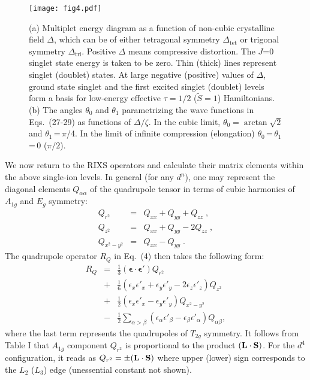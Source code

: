 \documentclass[twocolumn,prb,aps,showpacs,superscriptaddress]{revtex4-1}
\begin{document}
\begin{figure}
\centerline{\texttt{[image: fig4.pdf]}}
\caption{(a) Multiplet energy diagram as a function of non-cubic crystalline 
field $\Delta$, which can be of either tetragonal symmetry $\Delta_{\textrm{tet}}$
or trigonal symmetry $\Delta_{\textrm{tri}}$. Positive $\Delta$ means
compressive distortion. The $J$=0 singlet state energy is taken to be zero.
Thin (thick) lines represent singlet (doublet) states. At large negative 
(positive) values of $\Delta$, ground state singlet 
and the first excited singlet (doublet) levels form a basis for low-energy 
effective $\tau=1/2$ ($\tilde{S}=1$) Hamiltonians. 
(b) The angles $\theta_0$ and $\theta_1$ parametrizing the wave functions in 
Eqs.~(27-29) as functions of $\Delta/\zeta$. In the cubic limit, 
$\theta_0=\arctan{\sqrt{2}}$ and $\theta_1$\,=\,$\pi$/4. In the limit of 
infinite compression (elongation) $\theta_0$\,=\,$\theta_1$\,=\,0 ($\pi/2$).} 
\end{figure}

We now return to the RIXS operators and calculate their matrix elements
within the above single-ion levels. In general (for any $d^n$), one may 
represent the diagonal elements $Q_{\alpha\alpha}$ of the quadrupole 
tensor in terms of cubic harmonics of $A_{1g}$ and ${E_g}$ symmetry:  
\begin{eqnarray}
Q_{r^2}&=& Q_{xx}+Q_{yy}+Q_{zz}\;,\\
Q_{z^2}&=& Q_{xx}+Q_{yy}-2Q_{zz}\;,\\
Q_{x^2-y^2}&=& Q_{xx}-Q_{yy}\;.
\end{eqnarray}
The quadrupole operator $R_Q$ in Eq.~(4) then takes the following form:  
\begin{eqnarray}
R_Q&=& \tfrac{1}{3}(\mathbf{\epsilon\cdot\epsilon'})Q_{r^2}\nonumber\\
&+&\tfrac{1}{6}(\epsilon_x\epsilon'_x+\epsilon_y\epsilon'_y -
2\epsilon_z\epsilon'_z)Q_{z^2}\nonumber\\  
&+&\tfrac{1}{2}(\epsilon_x\epsilon'_x-\epsilon_y\epsilon'_y)Q_{x^2-y^2}\nonumber\\
&-&\tfrac{1}{2}\sum_{\alpha > \beta}(\epsilon_\alpha\epsilon'_\beta -
\epsilon_\beta \epsilon'_\alpha)Q_{\alpha\beta},
\end{eqnarray}
where the last term represents the quadrupoles of $T_{2g}$ symmetry. 
It follows from Table I that $A_{1g}$ component $Q_{r^2}$ is proportional to
the product $({\bf L}\cdot{\bf S})$. For the $d^4$ configuration, it reads as 
$Q_{r^2}=\pm ({\bf L}\cdot{\bf S})$ where upper (lower) sign corresponds to 
the $L_2$ ($L_3$) edge (unessential constant not shown).
\end{document}
